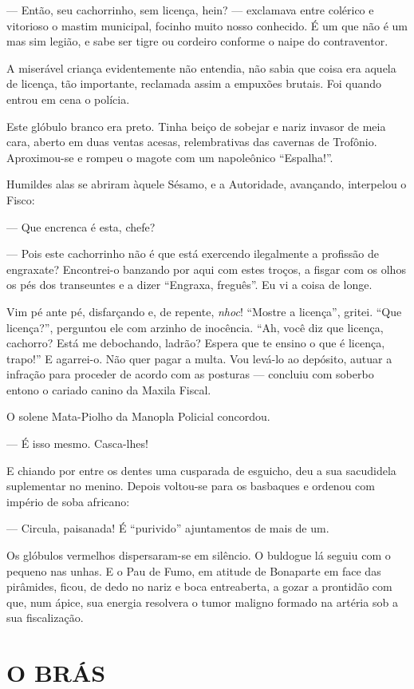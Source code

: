 --- Então, seu cachorrinho, sem licença, hein? --- exclamava entre
colérico e vitorioso o mastim municipal, focinho muito nosso conhecido.
É um que não é um mas sim legião, e sabe ser tigre ou cordeiro conforme
o naipe do contraventor.

A miserável criança evidentemente não entendia, não sabia que coisa era
aquela de licença, tão importante, reclamada assim a empuxões brutais.
Foi quando entrou em cena o polícia.

Este glóbulo branco era preto. Tinha beiço de sobejar e nariz invasor de
meia cara, aberto em duas ventas acesas, relembrativas das cavernas de
Trofônio. Aproximou-se e rompeu o magote com um napoleônico
``Espalha!''.

Humildes alas se abriram àquele Sésamo, e a Autoridade, avançando,
interpelou o Fisco:

--- Que encrenca é esta, chefe?

--- Pois este cachorrinho não é que está exercendo ilegalmente a
profissão de engraxate? Encontrei-o banzando por aqui com estes troços,
a fisgar com os olhos os pés dos transeuntes e a dizer ``Engraxa,
freguês''. Eu vi a coisa de longe.

Vim pé ante pé, disfarçando e, de repente, \emph{nhoc}! ``Mostre a
licença'', gritei. ``Que licença?'', perguntou ele com arzinho de
inocência. ``Ah, você diz que licença, cachorro? Está me debochando,
ladrão? Espera que te ensino o que é licença, trapo!'' E agarrei-o. Não
quer pagar a multa. Vou levá-lo ao depósito, autuar a infração para
proceder de acordo com as posturas --- concluiu com soberbo entono o
cariado canino da Maxila Fiscal.

O solene Mata-Piolho da Manopla Policial concordou.

--- É isso mesmo. Casca-lhes!

E chiando por entre os dentes uma cusparada de esguicho, deu a sua
sacudidela suplementar no menino. Depois voltou-se para os basbaques e
ordenou com império de soba africano:

--- Circula, paisanada! É ``purivido'' ajuntamentos de mais de um.

Os glóbulos vermelhos dispersaram-se em silêncio. O buldogue lá seguiu
com o pequeno nas unhas. E o Pau de Fumo, em atitude de Bonaparte em
face das pirâmides, ficou, de dedo no nariz e boca entreaberta, a gozar
a prontidão com que, num ápice, sua energia resolvera o tumor maligno
formado na artéria sob a sua fiscalização.

\section{O BRÁS}

